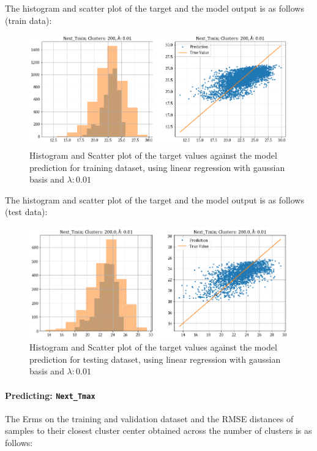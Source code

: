 \documentclass[12pt,a4paper]{article}
\newcommand{\noi}{\noindent}
\def\tt#1{\texttt{#1}}
\begin{document}
\noi
The histogram and scatter plot of the target and the model output is as follows (train data):
\begin{figure}[H]
     \centering
     \includegraphics[scale=0.49]{images/t3_d3/reg/T_min_nclu_200_lambda_0.01.png}
     \caption{Histogram and Scatter plot of the target values against the model prediction for training dataset, using linear regression with gaussian basis and $\lambda: 0.01$}
\end{figure}

\noi
The histogram and scatter plot of the target and the model output is as follows (test data):
\begin{figure}[H]
    \centering
    \includegraphics[scale=0.49]{images/t3_d3/reg/tmin_test.png}
    \caption{Histogram and Scatter plot of the target values against the model prediction for testing dataset, using linear regression with gaussian basis and $\lambda: 0.01$}
\end{figure}

\paragraph{Predicting: \tt{Next\_Tmax}}
The Erms on the training and validation dataset and the RMSE distances of samples to their closest cluster center obtained across the number of clusters is as follows:

\end{document}
